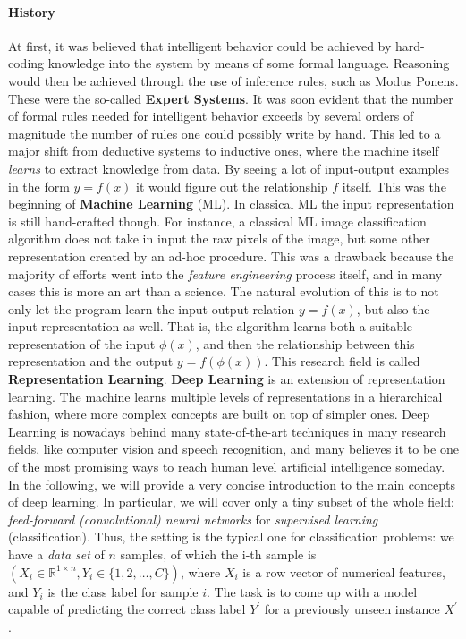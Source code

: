 \documentclass[../main.tex]{subfiles}
\begin{document}
    \paragraph{History}
    At first, it was believed that intelligent behavior could be achieved by hard-coding knowledge into the system by means
    of some formal language. Reasoning would then be achieved through the use of inference rules, such as Modus Ponens.
    These were the so-called \textbf{Expert Systems}.
    It was soon evident that the number of formal rules needed for intelligent behavior exceeds by several orders of magnitude
    the number of rules one could possibly write by hand.
    \newline
    This led to a major shift from deductive systems to inductive ones, where the machine itself \textit{learns} to extract
    knowledge from data. By seeing a lot of input-output examples in the form $y = f(x)$ it would figure out the relationship $f$ itself.
    This was the beginning of \textbf{Machine Learning} (ML). In classical ML the input representation is still hand-crafted though.
    For instance, a classical ML image classification algorithm does not take in input the raw pixels of the image, but some other
    representation created by an ad-hoc procedure. This was a drawback because the majority of efforts went into the
    \textit{feature engineering} process itself, and in many cases this is more an art than a science.
    \newline
    The natural evolution of this is to not only let the program learn the input-output relation $y = f(x)$,
    but also the input representation as well. That is, the algorithm learns both a suitable representation of the input $\phi(x)$, and then
    the relationship between this representation and the output $y = f(\phi(x))$. This research field is called \textbf{Representation Learning}.
    \newline
    \textbf{Deep Learning} is an extension of representation learning. The machine learns multiple levels of representations
    in a hierarchical fashion, where more complex concepts are built on top of simpler ones.
    Deep Learning is nowadays behind many state-of-the-art techniques in many research fields, like computer vision and speech recognition,
    and many believes it to be one of the most promising ways to reach human level artificial intelligence someday.
    \newline
    In the following, we will provide a very concise introduction to the main concepts of deep learning. In particular, we will cover only a
    tiny subset of the whole field: \textit{feed-forward (convolutional) neural networks} for \textit{supervised learning} (classification).
	Thus, the setting is the typical one for classification problems: we have a \textit{data set} of $n$ samples, of which the i-th sample
	is $(X_{i} \in \mathbb{R}^{1 \times n}, Y_{i} \in \{1, 2, \ldots, C\})$, where $X_{i}$ is a row vector of numerical features, and $Y_{i}$
	is the class label for sample $i$. The task is to come up with a model capable of predicting the correct class label $Y^{'}$ for a previously
	unseen instance $X^{'}$.
\end{document}
